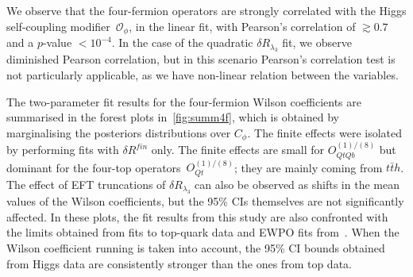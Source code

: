 	We observe that the four-fermion operators are strongly correlated with the Higgs self-coupling modifier~$\mathcal O_\phi$, in the linear fit, with Pearson's correlation of $ \gtrsim 0.7$ and a $p$-value $< 10^{-4}$.  In the case of the quadratic $\delta R_{\lambda_3}$ fit, we observe diminished Pearson correlation, but in this scenario Pearson's correlation test is not particularly applicable, as we have non-linear relation between the variables.
	\par The two-parameter fit results for the four-fermion Wilson coefficients are summarised in the forest plots in~\autoref{fig:summ4f}, which is obtained by marginalising the posteriors distributions over $C_\phi$. The finite effects were isolated by performing fits with $\delta R^{fin}$ only. The finite effects are small for  $O_{QtQb}^{(1)/(8)}$ but dominant for the four-top operators~$O_{Qt}^{(1)/(8)}$; they are mainly coming from $t\bar t h$.    The effect of EFT truncations of $\delta R_{\lambda_3}$ can also be observed as shifts in the mean values of the Wilson coefficients, but the 95\% CIs themselves are not significantly affected.  In these plots, the fit results from this study are also confronted with the limits obtained from fits to top-quark data \cite{Ethier:2021bye, Ellis:2020unq, Hartland:2019bjb,Brivio:2019ius,DHondt:2018cww, Zhang:2017mls} and EWPO fits from~\cite{Dawson:2022bxd}. When the Wilson coefficient running is taken into account, the 95\% CI  bounds obtained from Higgs data are consistently stronger than the ones from top data.
